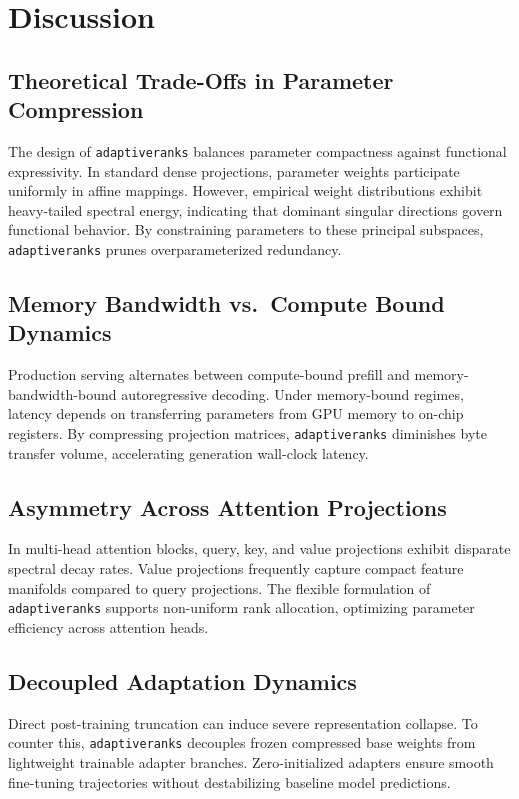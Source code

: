 \section{Discussion}

\subsection{Theoretical Trade-Offs in Parameter Compression}
The design of \texttt{adaptiveranks} balances parameter compactness against functional expressivity. In standard dense projections, parameter weights participate uniformly in affine mappings. However, empirical weight distributions exhibit heavy-tailed spectral energy, indicating that dominant singular directions govern functional behavior. By constraining parameters to these principal subspaces, \texttt{adaptiveranks} prunes overparameterized redundancy.

\subsection{Memory Bandwidth vs.\ Compute Bound Dynamics}
Production serving alternates between compute-bound prefill and memory-bandwidth-bound autoregressive decoding. Under memory-bound regimes, latency depends on transferring parameters from GPU memory to on-chip registers. By compressing projection matrices, \texttt{adaptiveranks} diminishes byte transfer volume, accelerating generation wall-clock latency.

\subsection{Asymmetry Across Attention Projections}
In multi-head attention blocks, query, key, and value projections exhibit disparate spectral decay rates. Value projections frequently capture compact feature manifolds compared to query projections. The flexible formulation of \texttt{adaptiveranks} supports non-uniform rank allocation, optimizing parameter efficiency across attention heads.

\subsection{Decoupled Adaptation Dynamics}
Direct post-training truncation can induce severe representation collapse. To counter this, \texttt{adaptiveranks} decouples frozen compressed base weights from lightweight trainable adapter branches. Zero-initialized adapters ensure smooth fine-tuning trajectories without destabilizing baseline model predictions.

